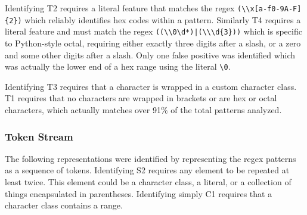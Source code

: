

Identifying T2 requires a literal feature that matches the regex \verb!(\\x[a-f0-9A-F]{2})! which reliably identifies hex codes within a pattern.
Similarly T4 requires a literal feature and must match the regex \verb!((\\0\d*)|(\\\d{3}))! which is specific to Python-style octal, requiring either exactly three digits after a slash, or a zero and some other digits after a slash.  Only one false positive was identified which was actually the lower end of a hex range using the literal \verb!\0!.

Identifying T3 requires that a character is wrapped in a custom character class. 
 T1 requires that no characters are wrapped in brackets or are hex or octal characters, which actually matches over 91\% of the total patterns analyzed.

\subsubsection{Token Stream }
The following representations were identified by representing the regex patterns as a sequence of tokens.
Identifying S2 requires any element to be repeated at least twice. This element could be a character class, a literal, or a collection of things encapsulated in parentheses.
Identifying simply C1 requires that a character class contains a range.


